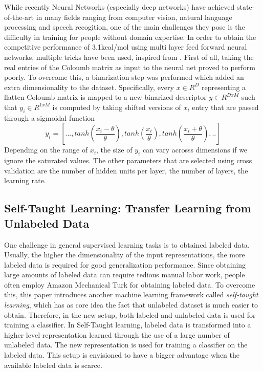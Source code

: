 \documentclass[10pt,journal,a4paper]{IEEEtran}
\begin{document}
While recently Neural Networks (especially deep networks) have achieved state-of-the-art in many fields ranging from computer vision, natural language processing and speech recogition, one of the main challenges they pose is the difficulty in training for people without domain expertise. 
In order to obtain the competitive performance of 3.1kcal/mol using multi layer feed forward neural networks, multiple tricks have been used, inspired from \cite{tricks}. First of all, taking the real entries of the Coloumb matrix as input to the neural net proved to perform poorly.
To overcome this, a binarization step was performed which added an extra dimensionality to the dataset. Specifically, every $x \in R^{D}$ representing a flatten Coloumb matrix is mapped to a new binarized descriptor $y \in R^{DxM}$ such that $y_i \in R^{1xM}$ is computed by taking shifted versions of $x_i$ entry that are passed through a sigmoidal function
\begin{equation}
	y_i = [..., tanh(\frac{x_i - \theta}{\theta}), tanh(\frac{x_i}{\theta}), tanh(\frac{x_i + \theta}{\theta}),..]
\end{equation}
Depending on the range of $x_i$, the size of $y_i$ can vary acrosss dimensions if we ignore the saturated values.
The other parameters that are selected using cross validation are the number of hidden units per layer, the number of layers, the learning rate.

\subsection{Self-Taught Learning: Transfer Learning from Unlabeled Data}
 
One challenge in general supervised learning tasks is to obtained labeled data. Usually, the higher the dimensionality of the input representations, the more labeled data is required for good generalization performance. Since obtaining large amounts of labeled data can require tedious manual labor work, people often employ Amazon Mechanical Turk for obtaining labeled data. To overcome this, this paper introduces another machine learning framework called \textit{self-taught learning}, which has as core idea the fact that unlabeled dataset is much easier to obtain. Therefore, in the new setup, both labeled and unlabeled data is used for training a classifier. In Self-Taught learning, labeled data is transformed into a higher level representation learned through the use of a large number of unlabeled data. The new representation  is used for training a classifier on the labeled data. This setup is envisioned to have a bigger advantage when the available labeled data is scarce. 
\end{document}
